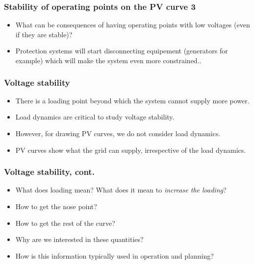 \documentclass{beamer}
\newlength\fheight
\newlength\fwidth
\begin{document}
\begin{frame}
\frametitle{Stability of operating points on the PV curve 3}
\setlength\fheight{0.3\textheight} 
\setlength{}

\begin{itemize}[<visible@+->]
\item What can be consequences of having operating points with low voltages (even if they are stable)?
\item Protection systems will start disconnecting equipement (generators for example) which will make the system even more constrained..
\end{itemize} 
\end{frame}

\begin{frame}
  \frametitle{Voltage stability}
  \begin{itemize}
  \item There is a loading point beyond which the system cannot supply more power.
  \item Load dynamics are critical to study voltage stability.
  \item However, for drawing PV curves, we do not consider load dynamics.
  \item PV curves show what the grid can supply, irrespective of the load dynamics.
  \end{itemize}
\setlength\fheight{0.3\textheight} 
\setlength{}

\end{frame}

\begin{frame}
  \frametitle{Voltage stability, cont.}
  \begin{itemize}
  \item What does loading mean? What does it mean to \emph{increase the loading}?
  \item How to get the nose point?
  \item How to get the rest of the curve?
  \item Why are we interested in these quantities?
  \item How is this information typically used in operation and planning?
  \end{itemize}
\setlength\fheight{0.3\textheight} 
\setlength{}

\end{frame}
\end{document}
